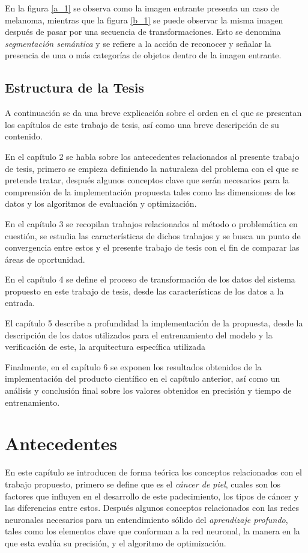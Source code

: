 En la figura \ref{a_1} se observa como la imagen entrante presenta un caso de melanoma, mientras que la figura \ref{b_1} se puede observar la misma imagen después de pasar por una secuencia de transformaciones. Esto se denomina \emph{segmentación semántica} y se refiere a la acción de reconocer y señalar la presencia de una o más categorías de objetos dentro de la imagen entrante.

\section{Estructura de la Tesis}
A continuación se da una breve explicación sobre el orden en el que se presentan los capítulos de este trabajo de tesis, así como una breve descripción de su contenido.

En el capítulo 2 se habla sobre los antecedentes relacionados al presente trabajo de tesis, primero se empieza definiendo la naturaleza del problema con el que se pretende tratar, después algunos conceptos clave que serán necesarios para la comprensión de la implementación propuesta tales como las dimensiones de los datos y los algoritmos de evaluación y optimización.

En el capítulo 3 se recopilan trabajos relacionados al método o problemática en cuestión, se estudia las características de dichos trabajos y se busca un punto de convergencia entre estos y el presente trabajo de tesis con el fin de comparar las áreas de oportunidad.

En el capítulo 4 se define el proceso de transformación de los datos del sistema propuesto en este trabajo de tesis, desde las características de los datos a la entrada.

El capítulo 5 describe a profundidad la implementación de la propuesta, desde la descripción de los datos utilizados para el entrenamiento del modelo y la verificación de este, la arquitectura específica utilizada 


Finalmente, en el capítulo 6 se exponen los resultados obtenidos de la implementación del producto científico en el capítulo anterior, así como un análisis y conclusión final sobre los valores obtenidos en precisión y tiempo de entrenamiento. 

\chapter{Antecedentes}
En este capítulo se introducen de forma teórica los conceptos relacionados con el trabajo propuesto, primero se define que es el \emph{cáncer de piel}, cuales son los factores que influyen en el desarrollo de este padecimiento, los tipos de cáncer y las diferencias entre estos. Después algunos conceptos relacionados con las redes neuronales necesarios para un entendimiento sólido del \emph{aprendizaje profundo}, tales como los elementos clave que conforman a la red neuronal, la manera en la que esta evalúa su precisión, y el algoritmo de optimización.

